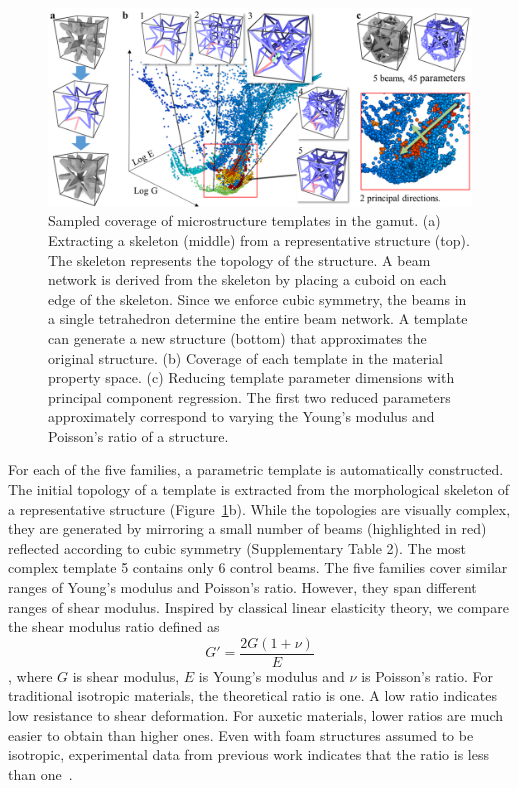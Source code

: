 \begin{figure}
	\includegraphics[width=\columnwidth]{images/mTemplates.png}
	\caption{Sampled coverage of microstructure templates in the gamut. (a) Extracting a skeleton (middle) from a representative structure (top). The skeleton represents the topology of the structure. A beam network is derived from the skeleton by placing a cuboid on each edge of the skeleton. Since we enforce cubic symmetry, the beams in a single tetrahedron determine the entire beam network. A template can generate a new structure (bottom) that approximates the original structure. (b) Coverage of each template in the material property space. (c) Reducing template parameter dimensions with principal component regression. The first two reduced parameters approximately correspond to varying the Young's modulus and Poisson's ratio of a structure. }
	\label{fig:mTemplates}
\end{figure}
For each of the five families, a parametric template is automatically constructed. The initial topology of a template is extracted from the morphological skeleton of a representative structure (Figure~\ref{fig:mTemplates}b). While the topologies are visually complex, they are generated by mirroring a small number of beams (highlighted in red) reflected according to cubic symmetry (Supplementary Table 2). The most complex template 5 contains only 6 control beams. The five families cover similar ranges of Young's modulus and Poisson's ratio. However, they span different ranges of shear modulus. Inspired by classical linear elasticity theory, we compare the shear modulus ratio defined as
\[
G'=\frac{2G(1+\nu)}{E}
\],
where $G$ is shear modulus, $E$ is Young's modulus and $\nu$ is Poisson's ratio. For traditional isotropic materials, the theoretical ratio is one. A low ratio indicates low resistance to shear deformation. For auxetic materials, lower ratios are much easier to obtain than higher ones. Even with foam structures assumed to be isotropic, experimental data from previous work indicates that the ratio is less than one~\citep{roh2013failure}.

